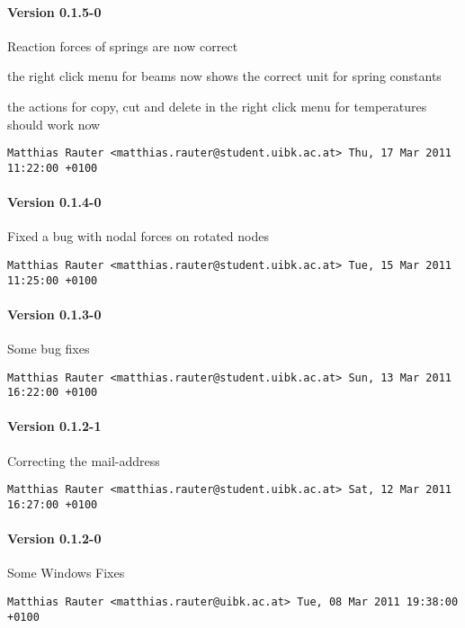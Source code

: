 \paragraph{Version 0.1.5-0}
\begin{compactitem}
\item Reaction forces of springs are now correct
\item the right click menu for beams now shows the correct unit for spring constants
\item the actions for copy, cut and delete in the right click menu for temperatures should work now
\end{compactitem}
\texttt{Matthias Rauter <matthias.rauter@student.uibk.ac.at>  Thu, 17 Mar 2011 11:22:00 +0100}
\paragraph{Version 0.1.4-0}
\begin{compactitem}
\item Fixed a bug with nodal forces on rotated nodes
\end{compactitem}
\texttt{Matthias Rauter <matthias.rauter@student.uibk.ac.at>  Tue, 15 Mar 2011 11:25:00 +0100}
\paragraph{Version 0.1.3-0}
\begin{compactitem}
\item Some bug fixes
\end{compactitem}
\texttt{Matthias Rauter <matthias.rauter@student.uibk.ac.at>  Sun, 13 Mar 2011 16:22:00 +0100}
\paragraph{Version 0.1.2-1}
\begin{compactitem}
\item Correcting the mail-address
\end{compactitem}
\texttt{Matthias Rauter <matthias.rauter@student.uibk.ac.at>  Sat, 12 Mar 2011 16:27:00 +0100}
\paragraph{Version 0.1.2-0}
\begin{compactitem}
\item Some Windows Fixes
\end{compactitem}
\texttt{Matthias Rauter <matthias.rauter@uibk.ac.at>  Tue, 08 Mar 2011 19:38:00 +0100}
